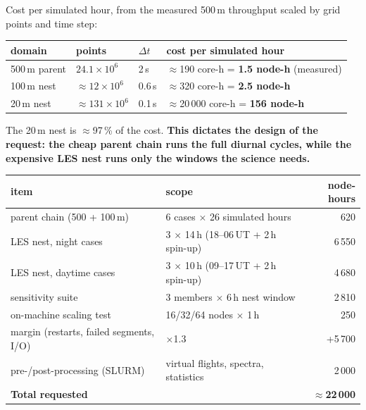 \documentclass[10pt,a4paper]{article}
\begin{document}
Cost per simulated hour, from the measured 500\,m throughput scaled by grid
points and time step:

\begin{center}
\begin{tabular}{@{}llll@{}}
\toprule
domain & points & $\Delta t$ & cost per simulated hour \\
\midrule
500\,m parent & $24.1\times10^6$ & 2\,s & $\approx$190 core-h = \textbf{1.5 node-h} (measured) \\
100\,m nest & $\approx12\times10^6$ & 0.6\,s & $\approx$320 core-h = \textbf{2.5 node-h} \\
20\,m nest & $\approx131\times10^6$ & 0.1\,s & $\approx$20\,000 core-h = \textbf{156 node-h} \\
\bottomrule
\end{tabular}
\end{center}

The 20\,m nest is $\approx$97\,\% of the cost. \textbf{This dictates the design
of the request: the cheap parent chain runs the full diurnal cycles, while the
expensive LES nest runs only the windows the science needs.}

\begin{center}
\begin{tabular}{@{}llr@{}}
\toprule
item & scope & node-hours \\
\midrule
parent chain (500 + 100\,m) & 6 cases $\times$ 26 simulated hours & 620 \\
LES nest, night cases & 3 $\times$ 14\,h (18--06\,UT + 2\,h spin-up) & 6\,550 \\
LES nest, daytime cases & 3 $\times$ 10\,h (09--17\,UT + 2\,h spin-up) & 4\,680 \\
sensitivity suite & 3 members $\times$ 6\,h nest window & 2\,810 \\
on-machine scaling test & 16/32/64 nodes $\times$ 1\,h & 250 \\
margin (restarts, failed segments, I/O) & $\times$1.3 & +5\,700 \\
pre-/post-processing (SLURM) & virtual flights, spectra, statistics & 2\,000 \\
\midrule
\textbf{Total requested} & & \textbf{$\approx$22\,000} \\
\bottomrule
\end{tabular}
\end{center}
\end{document}
